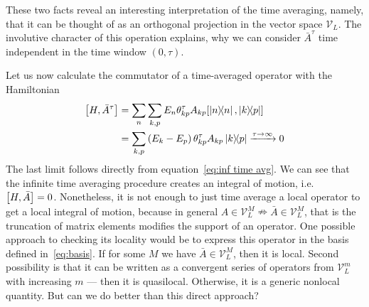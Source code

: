 These two facts reveal an interesting interpretation of the time averaging, namely, that it can be
thought of as an orthogonal projection in the vector space \(\mathcal{V}_L\). The involutive character of this operation explains,
why we can consider \(\bar{A}^{\tau}\) time independent in the time window \(\left(0,\tau\right)\).

Let us now calculate the commutator of a time-averaged operator with the Hamiltonian
\begin{align}
  \comm{H}{\bar{A}^{\tau}} & = \sum_n \sum_{k,p} E_n \theta_{kp}^{\tau} A_{kp} \comm{ \ketbra{n}{n}}{ \ketbra{k}{p}} \nonumber         \\
                           & = \sum_{k,p} \left(E_k-E_p\right) \theta_{kp}^{\tau} A_{kp} \ketbra{k}{p} \xrightarrow{\tau \to \infty} 0 \label{eq:time averaged commutator}
\end{align}
The last limit follows directly from equation~\eqref{eq:inf time avg}. We can see that the infinite time averaging procedure
creates an integral of motion, i.e. \(\comm{H}{\bar{A}} = 0\). Nonetheless, it is not enough to just time average a
local operator to get a local integral of motion, because in general \(A\in \mathcal{V}_L^M  \nRightarrow \bar{A} 
\in \mathcal{V}_L^M\), that is the truncation of matrix elements modifies the support of an operator.
One possible approach to checking its locality would be to
express this operator in the basis defined in~\eqref{eq:basis}. If for some \(M\) we have \(\bar{A}\in \mathcal{V}_L^M\),
then it is local. Second possibility is that it can be written as a convergent series of operators from \(\mathcal{V}_L^m\) with
increasing \(m\) --- then it is quasilocal. Otherwise, it is a generic nonlocal quantity. But can we do better than this
direct approach?

